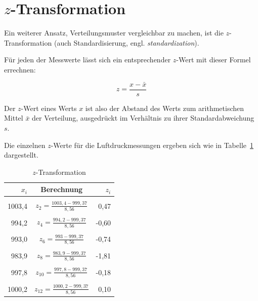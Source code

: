 \documentclass[
  11pt,
  ngerman,
  a4paper,
]{report}
\begin{document}
\hypertarget{z-transformation}{%
\section{\texorpdfstring{\(z\)-Transformation}{z-Transformation}}\label{z-transformation}}

Ein weiterer Ansatz, Verteilungsmuster vergleichbar zu machen, ist die \(z\)-Transformation (auch Standardisierung, engl. \emph{standardization}).

Für jeden der Messwerte lässt sich ein entsprechender \(z\)-Wert mit dieser Formel errechnen:

\[
z=\frac{x-\bar{x}}{s}
\label{eq:z}
\]

Der \(z\)-Wert eines Werts \(x\) ist also der Abstand des Werts zum arithmetischen Mittel \(\bar{x}\) der Verteilung, ausgedrückt im Verhältnis zu ihrer Standardabweichung \(s\).

Die einzelnen \(z\)-Werte für die Luftdruckmessungen ergeben sich wie in Tabelle~\ref{tab:trans} dargestellt.

\begin{table}

\caption{\label{tab:trans}$z$-Transformation}
\centering
\begin{tabular}[t]{rcr}
\toprule
\textbf{$x_i$} & \textbf{Berechnung} & \textbf{$z_i$}\\
\midrule
\cellcolor{gray!6}{1007,1} & \cellcolor{gray!6}{$z_{1}=\frac{1007,1-999,37}{8,56}$\medskip} & \cellcolor{gray!6}{0,90}\\
1003,4 & $z_{2}=\frac{1003,4-999,37}{8,56}$\medskip & 0,47\\
\cellcolor{gray!6}{990,7} & \cellcolor{gray!6}{$z_{3}=\frac{990,7-999,37}{8,56}$\medskip} & \cellcolor{gray!6}{-1,01}\\
994,2 & $z_{4}=\frac{994,2-999,37}{8,56}$\medskip & -0,60\\
\cellcolor{gray!6}{1000,9} & \cellcolor{gray!6}{$z_{5}=\frac{1000,9-999,37}{8,56}$\medskip} & \cellcolor{gray!6}{0,18}\\
993,0 & $z_{6}=\frac{993-999,37}{8,56}$\medskip & -0,74\\
\cellcolor{gray!6}{1016,0} & \cellcolor{gray!6}{$z_{7}=\frac{1016-999,37}{8,56}$\medskip} & \cellcolor{gray!6}{1,94}\\
983,9 & $z_{8}=\frac{983,9-999,37}{8,56}$\medskip & -1,81\\
\cellcolor{gray!6}{1007,4} & \cellcolor{gray!6}{$z_{9}=\frac{1007,4-999,37}{8,56}$\medskip} & \cellcolor{gray!6}{0,94}\\
997,8 & $z_{10}=\frac{997,8-999,37}{8,56}$\medskip & -0,18\\
\cellcolor{gray!6}{997,9} & \cellcolor{gray!6}{$z_{11}=\frac{997,9-999,37}{8,56}$\medskip} & \cellcolor{gray!6}{-0,17}\\
1000,2 & $z_{12}=\frac{1000,2-999,37}{8,56}$\medskip & 0,10\\
\bottomrule
\end{tabular}
\end{table}
\end{document}
